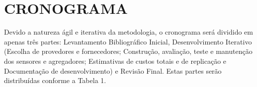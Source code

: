 
\chapter{CRONOGRAMA}
\label{chap:CRONOGRAMA}

Devido a natureza ágil e iterativa da metodologia, o cronograma será dividido em
apenas três partes: Levantamento Bibliográfico Inicial, Desenvolvimento
Iterativo (Escolha de provedores e fornecedores; Construção, avaliação, teste e
manutenção dos sensores e agregadores; Estimativas de custos totais e de
replicação e Documentação de desenvolvimento) e Revisão Final. Estas partes
serão distribuídas conforme a Tabela 1.

\begin{table}[htb]
\end{table}
